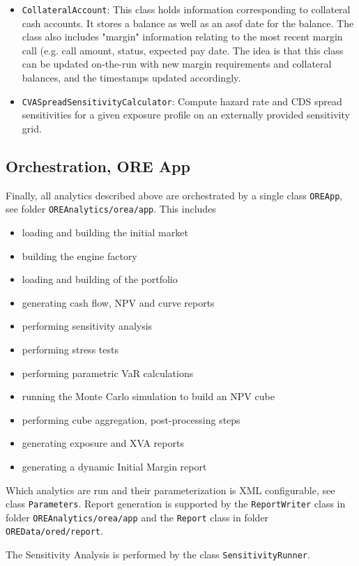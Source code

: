 \documentclass[12pt, a4paper]{article}
\begin{document}
\begin{itemize}
\item {\tt CollateralAccount}: This class holds information corresponding to collateral cash accounts. It stores a balance as well as an asof date for the balance. The class also includes "margin" information relating to the most recent margin call (e.g. call amount, status, expected pay date. The idea is that this class can be updated on-the-run with new margin requirements and collateral balances, and the timestamps updated accordingly.
\item {\tt CVASpreadSensitivityCalculator}: Compute hazard rate and CDS spread sensitivities for a given exposure profile on an externally provided sensitivity grid.
\end{itemize}

\subsection{Orchestration, ORE App}
Finally, all analytics described above are orchestrated by a single class {\tt OREApp}, see folder {\tt OREAnalytics/orea/app}. This includes
\begin{itemize}
\item loading and building the initial market
\item building the engine factory
\item loading and building of the portfolio
\item generating cash flow, NPV and curve reports
\item performing sensitivity analysis
\item performing stress tests
\item performing parametric VaR calculations
\item running the Monte Carlo simulation to build an NPV cube
\item performing cube aggregation, post-processing steps
\item generating exposure and XVA reports
\item generating a dynamic Initial Margin report
\end{itemize}

Which analytics are run and their parameterization is XML configurable, see class {\tt Parameters}. Report generation is supported by the {\tt ReportWriter} class in folder {\tt OREAnalytics/orea/app} and the {\tt Report} class in folder {\tt OREData/ored/report}.

The Sensitivity Analysis is performed by the class {\tt SensitivityRunner}.
\end{document}
